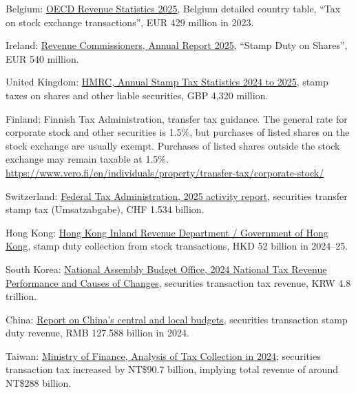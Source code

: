 \documentclass[../../main]{subfiles}
\begin{document}
\begin{footnotesize}
\begin{description}
\item Belgium: \href{https://data-explorer.oecd.org/}{OECD Revenue Statistics 2025}, Belgium detailed country table, ``Tax on stock exchange transactions'', EUR 429 million in 2023. 

\item Ireland: \href{https://www.revenue.ie/en/corporate/press-office/annual-report/2025/ar-2025.pdf}{Revenue Commissioners, Annual Report 2025}, ``Stamp Duty on Shares'', EUR 540 million. 

\item United Kingdom: \href{https://www.gov.uk/government/statistics/uk-stamp-tax-statistics/uk-stamp-tax-statistics-2023-to-2024-commentary}{HMRC, Annual Stamp Tax Statistics 2024 to 2025}, stamp taxes on shares and other liable securities, GBP 4,320 million. 

\item Finland: Finnish Tax Administration, transfer tax guidance. The general rate for corporate stock
and other securities is 1.5\%, but purchases of listed shares on the stock exchange are usually
exempt. Purchases of listed shares outside the stock exchange may remain taxable at 1.5\%.
\url{https://www.vero.fi/en/individuals/property/transfer-tax/corporate-stock/}

\item Switzerland: \href{https://www.estv.admin.ch/}{Federal Tax Administration, 2025 activity report}, securities transfer stamp tax (Umsatzabgabe), CHF 1.534 billion. 

\item Hong Kong: \href{https://www.info.gov.hk/gia/general/202510/22/P2025102100678.htm}{Hong Kong Inland Revenue Department / Government of Hong Kong}, stamp duty collection from stock transactions, HKD 52 billion in 2024--25. 

\item South Korea: \href{https://korea.nabo.go.kr/}{National Assembly Budget Office, 2024 National Tax Revenue Performance and Causes of Changes}, securities transaction tax revenue, KRW 4.8 trillion. 

\item China: \href{https://en.theorychina.org.cn/c/2025-03-14/1522306.shtml}{Report on China's central and local budgets}, securities transaction stamp duty revenue, RMB 127.588 billion in 2024. 

\item Taiwan: \href{https://service.mof.gov.tw/public/Data/statistic/bulletin/114/Analysis\%20of\%20Tax\%20Collection\%20in\%202024.pdf}{Ministry of Finance, Analysis of Tax Collection in 2024}; securities transaction tax increased by NT\$90.7 billion, implying total revenue of around NT\$288 billion. 


\end{description}
\end{footnotesize}
\end{document}
